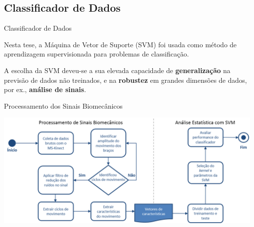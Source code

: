 \documentclass{beamer}
\begin{document}
\subsection{Classificador de Dados}
\begin{frame}{Classificador de Dados}
\begin{block}{}
			Nesta tese, a Máquina de Vetor de Suporte (SVM) foi usada como método de aprendizagem supervisionada para problemas de classificação.
			
			A escolha da SVM deveu-se a sua elevada capacidade de \textbf{generalização} na previsão de dados não treinados, e na \textbf{robustez} em grandes dimensões de dados, por ex., \textbf{análise de sinais}.			
\end{block}
\end{frame}



\begin{frame}{Processamento dos Sinais Biomecânicos}
  
      \left \includegraphics[height=1.9 in]{img/biomecprocessorh.png}
  
\end{frame}






\end{document}
